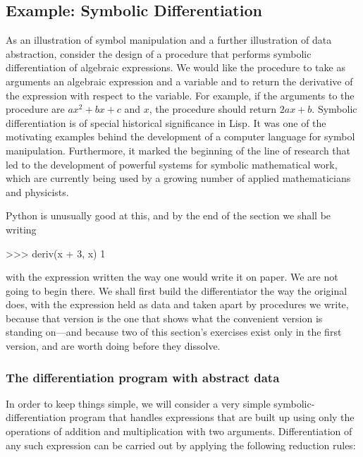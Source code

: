 \subsection{Example: Symbolic Differentiation}
\label{Section 2.3.2}

As an illustration of symbol manipulation and a further illustration of data
abstraction, consider the design of a procedure that performs symbolic
differentiation of algebraic expressions.  We would like the procedure to take
as arguments an algebraic expression and a variable and to return the
derivative of the expression with respect to the variable.  For example, if the
arguments to the procedure are \( ax^2 + bx + c \) and \( x \), the procedure
should return \( 2ax + b \).  Symbolic differentiation is of special historical
significance in Lisp.  It was one of the motivating examples behind the
development of a computer language for symbol manipulation.  Furthermore, it
marked the beginning of the line of research that led to the development of
powerful systems for symbolic mathematical work, which are currently being used
by a growing number of applied mathematicians and physicists.

\begin{revealTheSurface}
Python is unusually good at this, and by the end of the section we shall be
writing

\begin{codeBlock}
>>> deriv(x + 3, x)
1
\end{codeBlock}

\noindent
with the expression written the way one would write it on paper.  We are not
going to begin there.  We shall first build the differentiator the way the
original does, with the expression held as data and taken apart by procedures
we write, because that version is the one that shows what the convenient
version is standing on---and because two of this section's exercises exist only
in the first version, and are worth doing before they dissolve.
\end{revealTheSurface}

\subsubsection*{The differentiation program with abstract data}

In order to keep things simple, we will consider a very simple
symbolic-differentiation program that handles expressions that are built up
using only the operations of addition and multiplication with two arguments.
Differentiation of any such expression can be carried out by applying the
following reduction rules:

